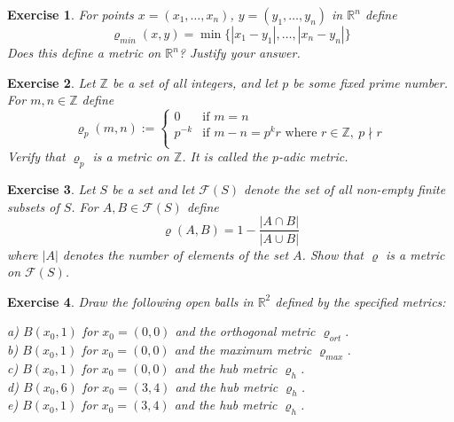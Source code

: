 \documentclass[11pt, letterpaper, oneside]{report}
\theoremstyle{pplain}
\newtheorem{ITERMVALUE THM}[theorem]{Intermediate Value Theorem}
\newtheorem{HEINEBOREL THM}[theorem]{Heine-Borel Theorem}
\newtheorem{UMETR THM}[theorem]{Urysohn Metrization Theorem}
\newtheorem{UMETR2 THM}[theorem]{Urysohn Metrization Theorem (v.2)}
\theoremstyle{ddefinition}
\theoremstyle{nnn}
\newtheorem{TDA NN}[theorem]{Topological Data Analysis. }
\theoremstyle{eexercise}
\newtheorem{exercise}{Exercise}[chapter]
\newcommand{\Z}{{\mathbb Z}}
\newcommand{\R}{{\mathbb R}}
\newcommand{\FF}{{\mathcal F}}
\begin{document}
\begin{exercise} 
For points $x= (x_{1}, \dots, x_{n})$, $y=(y_{1}, \dots, y_{n})$ in $\R^{n}$
define 
$$\varrho_{min}(x, y) = \min\{|x_1-y_1|,  \dots,  |x_n-y_n|\}$$
Does this define a metric on $\R^{n}$? Justify your answer.
\end{exercise}





\begin{exercise}
Let $\Z$ be a set of all integers, and let $p$ be some fixed prime number. For $m, n\in \Z$
define 
$$\varrho_{p}(m, n) := 
\begin{cases}
0 & \text{if } m=n \\
p^{-k} & \text{if } m-n = p^{k}r \text{ where } r\in \Z, \ p\nmid r \\  
\end{cases}
$$
Verify that $\varrho_{p}$ is a metric on $\Z$. It is called the \emph{$p$-adic metric}.
\end{exercise}




\begin{exercise}
Let $S$ be a set and let $\FF(S)$ denote the set of all non-empty finite subsets of $S$. For $A, B\in \FF(S)$
define
$$\varrho(A, B) = 1 - \frac{|A\cap B|}{|A\cup B|}$$
where $|A|$ denotes the number of elements of the set $A$. Show that $\varrho$ is a metric on $\FF(S)$.
\end{exercise}







\begin{exercise}
Draw the following open  balls in $\R^{2}$ defined by the specified metrics:

\vskip -2mm

a)  $B(x_{0}, 1)$ for  $x_{0} = (0, 0)$ and the orthogonal metric $\varrho_{ort}$. \\
b) $B(x_{0}, 1)$ for  $x_{0} = (0, 0)$ and the maximum metric $\varrho_{max}$. \\
c) $B(x_{0}, 1)$ for  $x_{0} = (0, 0)$ and the hub metric $\varrho_{h}$. \\
d) $B(x_{0}, 6)$ for  $x_{0} = (3, 4)$ and the hub metric $\varrho_{h}$. \\
e) $B(x_{0}, 1)$ for  $x_{0} = (3, 4)$ and the hub metric $\varrho_{h}$. \\
\end{exercise}
\end{document}
